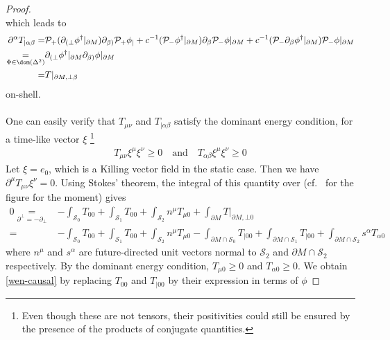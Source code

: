 \begin{proof}
\begin{equation*}
\end{equation*}
which leads to
\begin{equation*}
\begin{split}
\partial^\alpha T_{|\alpha \beta} = & 
 \mathcal{P}_+(\partial_{(\bot} \phi^\dagger\vert_{\partial M})\partial_{\beta)}\mathcal{P}_+ \phi_| + 
c^{-1}(\mathcal{P}_-\phi^\dagger\vert_{\partial M}) \partial_\beta\mathcal{P}_- \phi\vert_{\partial M}
+c^{-1}(\mathcal{P}_-\partial_\beta\phi^\dagger\vert_{\partial M}) \mathcal{P}_- \phi\vert_{\partial M} \\ 
\underset{\Phi \in \dom(\Delta^2)}{=} & 
\partial_{(\bot}\phi^\dagger\vert_{\partial M} \partial_{\beta)}\phi\vert_{\partial M} \\
= & T\vert_{\partial M,{\bot\beta}}
\end{split}
\end{equation*}
on-shell. \\\\
One can easily verify that $T_{\mu\nu}$ and $T_{| \alpha\beta}$ satisfy the dominant energy condition, \ie for a time-like vector $\xi$ \footnote{
Even though these are not tensors, their positivities could still be ensured by the presence of the products of conjugate quantities.
}
\begin{equation*}
\begin{split}
T_{\mu\nu} \xi^\mu \xi^\nu \geq 0 \quad \mathrm{ and }\quad
T_{\alpha\beta} \xi^\mu \xi^\nu \geq 0 
\end{split}
\end{equation*}
Let $\xi = e_0$, which is a Killing vector field in the static case.
Then we have $\partial^\mu T_{\mu\nu}\xi^\nu = 0$.
Using Stokes' theorem, the integral of this quantity over (cf.~\cite{Zahn2016} for the figure for the moment) %
gives
\begin{equation*}
\begin{split}
0 \underset{\partial^\bot = -\partial_\bot}{=} &
- \int_{\mathcal{S}_0}T_{00} + \int_{\mathcal{S}_1} T_{00} + \int_{\mathcal{S}_2} n^\mu T_{\mu 0} + \int_{\partial M} T \vert_{\partial M, \bot 0}   \\
= & - \int_{\mathcal{S}_0} T_{00} + \int_{\mathcal{S}_1} T_{00} + 
 \int_{\mathcal{S}_2} n^\mu T_{\mu 0} -
  \int_{\partial M \cap \mathcal{S}_0} T_{|00}  +\int_{\partial M \cap \mathcal{S}_1} T_{|00}
 + \int_{\partial M \cap \mathcal{S}_2} s^\alpha T_{\alpha 0}
\end{split}
\end{equation*}
where $n^\mu$ and $s^\alpha$ are future-directed unit vectors normal to $\mathcal{S}_2$ and $\partial M \cap \mathcal{S}_2$ respectively.
By the dominant energy condition, 
$T_{\mu 0 }\geq 0$ and $T_{\alpha 0 }\geq 0$. 
We obtain \cref{wen-causal} by replacing $T_{00}$ and $T_{| 00}$ by their expression in terms of $\phi$
\end{proof}
